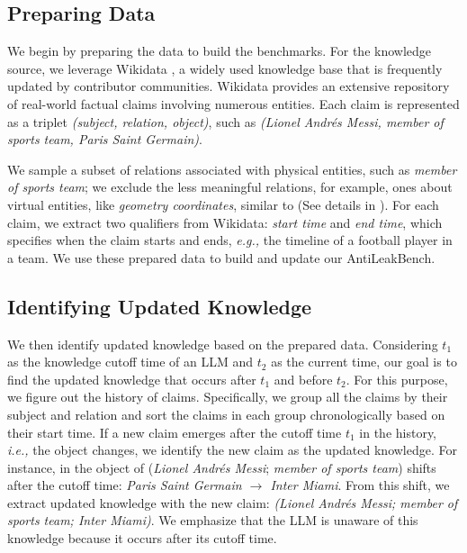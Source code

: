 \documentclass[11pt]{article}
\newcommand{\ie}{\emph{i.e.,}\xspace}
\newcommand{\eg}{\emph{e.g.,}\xspace}
\newcommand{\benchname}{{AntiLeakBench}\xspace}
\begin{document}
    \subsection{Preparing Data}
        We begin by preparing the data to build the benchmarks.
        For the knowledge source, we leverage Wikidata \cite{wikidata2014}, a widely used knowledge base that is frequently updated by contributor communities.
        Wikidata provides an extensive repository of real-world factual claims involving numerous entities.
        Each claim is represented as a triplet \textit{(subject, relation, object)}, such as \textit{(Lionel Andrés Messi, member of sports team, Paris Saint Germain)}.

        We sample a subset of relations associated with physical entities, such as \textit{member of sports team};
        we exclude the less meaningful relations, for example, ones about virtual entities, like \textit{geometry coordinates}, similar to \citet{zhong2023mquake,wu2024akew} (See details in ).
        For each claim, we extract two qualifiers from Wikidata: \textit{start time} and \textit{end time},
        which specifies when the claim starts and ends, \eg the timeline of a football player in a team.
        We use these prepared data to build and update our \benchname.

    \subsection{Identifying Updated Knowledge}
        We then identify updated knowledge based on the prepared data.
        Considering $t_{1}$ as the knowledge cutoff time of an LLM and $t_{2}$ as the current time,
        our goal is to find the updated knowledge that occurs after $t_{1}$ and before $t_{2}$.
        For this purpose, we figure out the history of claims.
        Specifically, we group all the claims by their subject and relation
        and sort the claims in each group chronologically based on their start time.
        If a new claim emerges after the cutoff time $t_{1}$ in the history, \ie the object changes,
        we identify the new claim as the updated knowledge.
        For instance, in  the object of (\textit{Lionel Andrés Messi}; \textit{member of sports team}) shifts after the cutoff time: \textit{Paris Saint Germain $\rightarrow$ Inter Miami}.
        From this shift, we extract updated knowledge with the new claim: \textit{(Lionel Andrés Messi; member of sports team; Inter Miami)}.
        We emphasize that the LLM is unaware of this knowledge because it occurs after its cutoff time.
\end{document}
